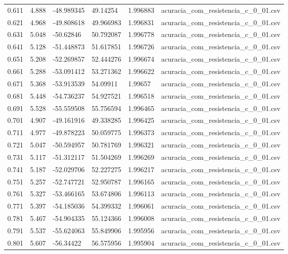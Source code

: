 \begin{table}
\begin{tabular}{llllll}
0.611 & 4.888 & -48.989345 & 49.14254 & 1.996883 & acuracia\_com\_resistencia\_c\_0\_01.csv \\
0.621 & 4.968 & -49.808618 & 49.966983 & 1.996831 & acuracia\_com\_resistencia\_c\_0\_01.csv \\
0.631 & 5.048 & -50.62846 & 50.792087 & 1.996778 & acuracia\_com\_resistencia\_c\_0\_01.csv \\
0.641 & 5.128 & -51.448873 & 51.617851 & 1.996726 & acuracia\_com\_resistencia\_c\_0\_01.csv \\
0.651 & 5.208 & -52.269857 & 52.444276 & 1.996674 & acuracia\_com\_resistencia\_c\_0\_01.csv \\
0.661 & 5.288 & -53.091412 & 53.271362 & 1.996622 & acuracia\_com\_resistencia\_c\_0\_01.csv \\
0.671 & 5.368 & -53.913539 & 54.09911 & 1.99657 & acuracia\_com\_resistencia\_c\_0\_01.csv \\
0.681 & 5.448 & -54.736237 & 54.927521 & 1.996518 & acuracia\_com\_resistencia\_c\_0\_01.csv \\
0.691 & 5.528 & -55.559508 & 55.756594 & 1.996465 & acuracia\_com\_resistencia\_c\_0\_01.csv \\
0.701 & 4.907 & -49.161916 & 49.338285 & 1.996425 & acuracia\_com\_resistencia\_c\_0\_01.csv \\
0.711 & 4.977 & -49.878223 & 50.059775 & 1.996373 & acuracia\_com\_resistencia\_c\_0\_01.csv \\
0.721 & 5.047 & -50.594957 & 50.781769 & 1.996321 & acuracia\_com\_resistencia\_c\_0\_01.csv \\
0.731 & 5.117 & -51.312117 & 51.504269 & 1.996269 & acuracia\_com\_resistencia\_c\_0\_01.csv \\
0.741 & 5.187 & -52.029706 & 52.227275 & 1.996217 & acuracia\_com\_resistencia\_c\_0\_01.csv \\
0.751 & 5.257 & -52.747721 & 52.950787 & 1.996165 & acuracia\_com\_resistencia\_c\_0\_01.csv \\
0.761 & 5.327 & -53.466165 & 53.674806 & 1.996113 & acuracia\_com\_resistencia\_c\_0\_01.csv \\
0.771 & 5.397 & -54.185036 & 54.399332 & 1.996061 & acuracia\_com\_resistencia\_c\_0\_01.csv \\
0.781 & 5.467 & -54.904335 & 55.124366 & 1.996008 & acuracia\_com\_resistencia\_c\_0\_01.csv \\
0.791 & 5.537 & -55.624063 & 55.849906 & 1.995956 & acuracia\_com\_resistencia\_c\_0\_01.csv \\
0.801 & 5.607 & -56.34422 & 56.575956 & 1.995904 & acuracia\_com\_resistencia\_c\_0\_01.csv \\

\end{tabular}
\end{table}
